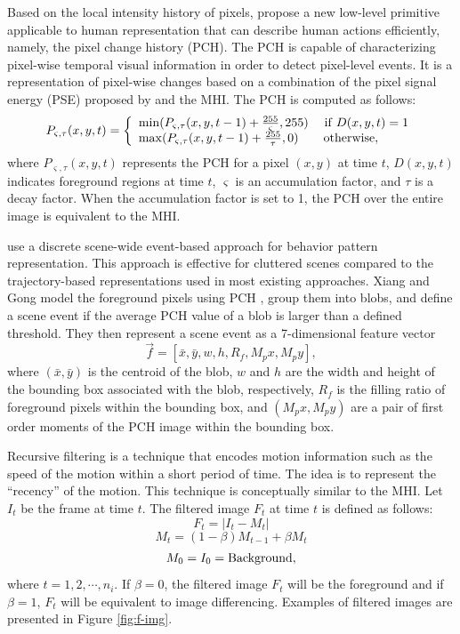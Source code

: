 Based on the local intensity history of
pixels,  propose a new low-level primitive
applicable to human representation that can describe human actions
efficiently, namely, the pixel change history (PCH).  The PCH is
capable of characterizing pixel-wise temporal visual information in
order to detect pixel-level events. It is a representation of
pixel-wise changes based on a combination of the pixel signal energy
(PSE) proposed by  and the MHI. The PCH is
computed as follows:
\[
  P_{\varsigma ,\tau } (x,y,t) = \left\{ \begin{array}{l}
  \min (P_{\varsigma ,\tau } (x,y,t - 1) + \frac{{255}}{\varsigma },255)\quad 
  \; {\rm if}\;D(x,y,t) = 1 \\ 
  \max (P_{\varsigma ,\tau } (x,y,t - 1) + \frac{{255}}{\tau },0)\quad \quad 
  {\rm otherwise}, \\ 
  \end{array} \right.
\]
where $P_{\varsigma ,\tau } (x,y,t)$ represents the PCH for a pixel
$(x,y)$ at time $t$, $D(x,y,t)$ indicates foreground regions at time
$t$, $\varsigma$ is an accumulation factor, and $\tau$ is a decay
factor. When the accumulation factor is set to 1, the PCH over the
entire image is equivalent to the MHI. 

 use a discrete scene-wide event-based
approach for behavior pattern representation. This approach is
effective for cluttered scenes compared to the trajectory-based
representations used in most existing approaches. Xiang and Gong model
the foreground pixels using PCH , group them
into blobs, and define a scene event if the average PCH value of a blob is
larger than a defined threshold. They then represent a scene event as
a 7-dimensional feature vector
\[
  \vec{f} = [ \bar{x}, \bar{y} , w, h, R_f , M_px, M_py],
\]
where $(\bar{x}, \bar{y})$ is the centroid of the blob, $w$ and $h$
are the width and height of the bounding box associated with the blob,
respectively, $R_f$ is the filling ratio of foreground pixels within
the bounding box, and $(M_px, M_py)$ are a pair of first order moments
of the PCH image within the bounding box. 

Recursive filtering  is a technique
that encodes motion information such as the speed of the motion within
a short period of time. The idea is to represent the ``recency'' of
the motion. This technique is conceptually similar to the MHI. Let
$I_t$ be the frame at time $t$. The filtered image $F_t$ at time $t$
is defined as follows:
\[
  F_t = \left| {I_t  - M_t } \right|
\]
\[
  M_t = (1 - \beta)M_{t - 1}  + \beta M_t 
\]
\[
  M_0 = I_0 = {\rm Background},
\]
where $t = 1, 2, \cdots, n_i$. If $\beta = 0$, the filtered image
$F_t$ will be the foreground and if $\beta = 1$, $F_t$ will be
equivalent to image differencing. Examples of filtered images are
presented in Figure \ref{fig:f-img}.

